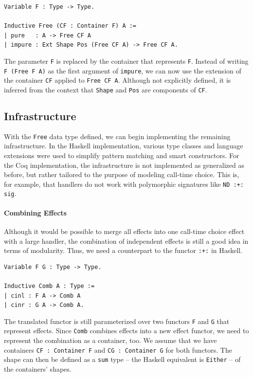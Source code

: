 \documentclass[a4paper, 11pt, fleqn, twoside, abstract=on]{scrreprt}
\newcommand{\hinl}[1]{\texttt{#1}}
\newcommand{\cinl}[1]{\texttt{#1}}
\begin{document}
\begin{verbatim}
Variable F : Type -> Type.

Inductive Free (CF : Container F) A :=
| pure   : A -> Free CF A
| impure : Ext Shape Pos (Free CF A) -> Free CF A.
\end{verbatim}
\noindent
The parameter \cinl{F} is replaced by the container that represents \cinl{F}.
Instead of writing \cinl{F (Free F A)} as the first argument of \cinl{impure}, we can now use the extension of the container \cinl{CF} applied to \cinl{Free CF A}.
Although not explicitly defined, it is inferred from the context that \hinl{Shape} and \hinl{Pos} are components of \hinl{CF}.

\subsection{Infrastructure}
\label{subsec:infrastructure}

With the \cinl{Free} data type defined, we can begin implementing the remaining infrastructure. 
In the Haskell implementation, various type classes and language extensions were used to simplify pattern matching and smart constructors.
For the Coq implementation, the infrastructure is not implemented as generalized as before, but rather tailored to the purpose of modeling call-time choice.
This is, for example, that handlers do not work with polymorphic signatures like \cinl{ND :+: sig}.

\paragraph{Combining Effects}
Although it would be possible to merge all effects into one call-time choice effect with a large handler, the combination of independent effects is still a good idea in terms of modularity.
Thus, we need a counterpart to the functor \hinl{:+:} in Haskell.

\begin{verbatim}
Variable F G : Type -> Type.

Inductive Comb A : Type :=
| cinl : F A -> Comb A
| cinr : G A -> Comb A.
\end{verbatim}
\noindent
The translated functor is still parameterized over two functors \cinl{F} and \cinl{G} that represent effects.
Since \cinl{Comb} combines effects into a new effect functor, we need to represent the combination as a container, too.
We assume that we have containers \cinl{CF : Container F} and \cinl{CG : Container G} for both functors.
The shape can then be defined as a \cinl{sum} type -- the Haskell equivalent is \hinl{Either} -- of the containers' shapes.
\end{document}
